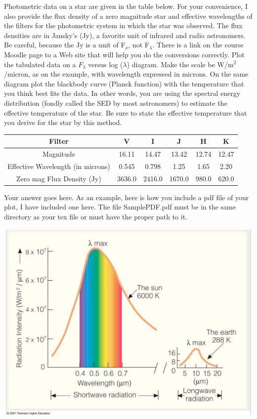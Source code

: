 \documentclass[12pt]{article}
\newenvironment{problem}[2][Problem]{\begin{trivlist}
\item[\hskip \labelsep {\bfseries #1}\hskip \labelsep {\bfseries #2.}]}{\end{trivlist}}
\newenvironment{answer}[2][Answer]{\begin{trivlist}
\item[\hskip \labelsep {\bfseries #1}\hskip \labelsep {\bfseries #2.}]}{\end{trivlist}}
\begin{document}
\begin{problem}{3}
Photometric data on a star are given in the table below. For your convenience, I also provide the flux density of a zero magnitude star and effective wavelengths of the filters for the photometric system in which the star was observed. The flux densities are in Jansky's (Jy), a favorite unit of infrared and radio astronomers. Be careful, because the Jy is a unit of F$_\nu$, not F$_\lambda$. There is a link on the course Moodle page to a Web site that will help you do the conversions correctly. Plot the tabulated data on a $F_\lambda$ versus log ($\lambda$) diagram. Make the scale be W/m$^2$/micron, as on the example, with wavelength expressed in microns. On the same diagram plot the blackbody curve (Planck function) with the temperature that you think best fits the data. In other words, you are using the spectral energy distribution (fondly called the SED by most astronomers) to estimate the effective temperature of the star. Be sure to state the effective temperature that you derive for the star by this method. 
\bigskip
\smallskip

\begin{tabular} {cccccc}

Filter & V & I & J & H & K \\
\hline
\hline
Magnitude & 16.11 & 14.47 & 13.42 & 12.74 & 12.47 \\
Effective Wavelength (in microns) & 0.545 & 0.798 & 1.25 & 1.65 & 2.20 \\
Zero mag Flux Density (Jy) & 3636.0 & 2416.0 & 1670.0 & 980.0 & 620.0 \\
\hline

\end{tabular}

\end{problem}


\begin{answer}{3}
Your answer goes here. As an example, here is how you include a pdf file of your plot, I have included one here. The file SamplePDF.pdf must be in the same directory as your tex file or must have the proper path to it.

\end{answer}

\bigskip
\bigskip

\includegraphics [scale=0.4] {SamplePDF}
 
\end{document}
